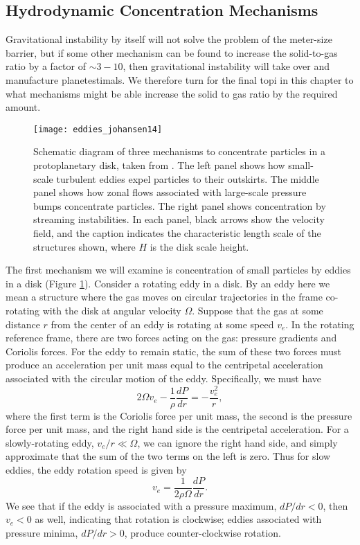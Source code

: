 \subsection{Hydrodynamic Concentration Mechanisms}

Gravitational instability by itself will not solve the problem of the meter-size barrier, but if some other mechanism can be found to increase the solid-to-gas ratio by a factor of $\sim 3-10$, then gravitational instability will take over and manufacture planetestimals. We therefore turn for the final topi in this chapter to what mechanisms might be able increase the solid to gas ratio by the required amount.

\begin{figure}
\texttt{[image: eddies\_johansen14]}
\caption[Schematic of particle concentration by eddies in a protoplanetary disk]{
\label{fig:eddies_johansen14a}
Schematic diagram of three mechanisms to concentrate particles in a protoplanetary disk, taken from \citet{johansen14a}. The left panel shows how small-scale turbulent eddies expel particles to their outskirts. The middle panel shows how zonal flows associated with large-scale pressure bumps concentrate particles. The right panel shows concentration by streaming instabilities. In each panel, black arrows show the velocity field, and the caption indicates the characteristic length scale of the structures shown, where $H$ is the disk scale height.
}
\end{figure}

The first mechanism we will examine is concentration of small particles by eddies in a disk (Figure \ref{fig:eddies_johansen14a}). Consider a rotating eddy in a disk. By an eddy here we mean a structure where the gas moves on circular trajectories in the frame co-rotating with the disk at angular velocity $\Omega$. Suppose that the gas at some distance $r$ from the center of an eddy is rotating at some speed $v_e$. In the rotating reference frame, there are two forces acting on the gas: pressure gradients and Coriolis forces. For the eddy to remain static, the sum of these two forces must produce an acceleration per unit mass equal to the centripetal acceleration associated with the circular motion of the eddy. Specifically, we must have
\begin{equation}
2\Omega v_e - \frac{1}{\rho} \frac{dP}{dr} = -\frac{v_e^2}{r},
\end{equation}
where the first term is the Coriolis force per unit mass, the second is the pressure force per unit mass, and the right hand side is the centripetal acceleration. For a slowly-rotating eddy, $v_e /r \ll \Omega$, we can ignore the right hand side, and simply approximate that the sum of the two terms on the left is zero. Thus for slow eddies, the eddy rotation speed is given by
\begin{equation}
v_e = \frac{1}{2\rho\Omega} \frac{dP}{dr}.
\end{equation}
We see that if the eddy is associated with a pressure maximum, $dP/dr < 0$, then $v_e < 0$ as well, indicating that rotation is clockwise; eddies associated with pressure minima, $dP/dr > 0$, produce counter-clockwise rotation.


